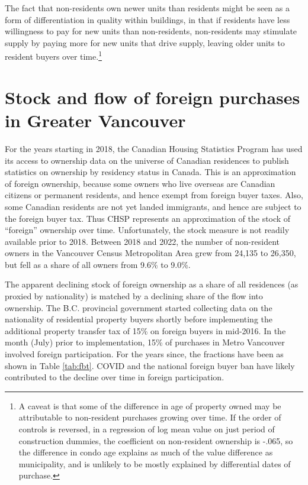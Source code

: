 \documentclass[12pt]{article}
\begin{document}
The fact that non-residents own newer units than residents might be seen as a form of differentiation in quality within buildings, in that if residents have less willingness to pay for new units than non-residents, non-residents may stimulate supply by paying more for new units that drive supply, leaving older units to resident buyers over time.\footnote{A caveat is that some of the difference in age of property owned may be attributable to non-resident purchases growing over time. If the order of controls is reversed, in a regression of log mean value on just period of construction dummies, the coefficient on non-resident ownership is -.065, so the difference in condo age explains as much of the value difference as municipality, and is unlikely to be mostly explained by differential dates of purchase.}

\section{Stock and flow of foreign purchases in Greater Vancouver}

For the years starting in 2018, the Canadian Housing Statistics Program has
used its access to ownership data on the universe of Canadian residences to
publish statistics on ownership by residency status in Canada. This is an
approximation of foreign ownership, because some owners who live overseas are
Canadian citizens or permanent residents, and hence exempt from foreign buyer
taxes. Also, some Canadian residents are not yet landed immigrants, and hence
are subject to the foreign buyer tax. Thus CHSP represents an approximation of
the stock of ``foreign'' ownership over time. Unfortunately, the stock measure
is not readily available prior to 2018. Between 2018 and 2022, the number of
non-resident owners in the Vancouver Census Metropolitan Area grew from 24,135
to 26,350, but fell as a share of all owners from 9.6\% to 9.0\%.

The apparent declining stock of foreign ownership as a share of all residences
(as proxied by nationality) is matched by a declining share of the flow into ownership. The B.C. provincial
government started collecting data on the nationality of residential property
buyers shortly before implementing the additional property transfer tax of 15\%
on foreign buyers in mid-2016. In the month (July) prior to implementation,
15\% of purchases in Metro Vancouver involved foreign participation. For the
years since, the fractions have been as shown in Table \ref{tab:fbt}. COVID and
the national foreign buyer ban have likely contributed to the decline over time
in foreign participation.
\end{document}
